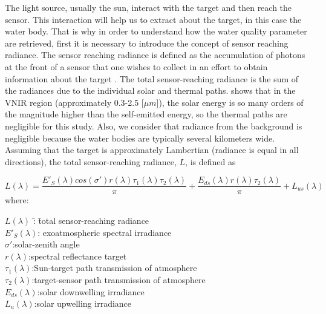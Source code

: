 The light source, usually the sun, interact with the target and then reach the sensor. This interaction will help us to extract about the target, in this case the water body. That is why in order to understand how the water quality parameter are retrieved, first it is necessary to introduce the concept of sensor reaching radiance. The sensor reaching radiance is defined as the accumulation of photons at the front of a sensor that one wishes to collect in an effort to obtain information about the target \cite{GeraceThesis} . The total sensor-reaching radiance is the sum of the radiances due to the individual solar and thermal paths.  \cite{Schott} shows that in the VNIR region (approximately 0.3-2.5 [$\mu m$]), the solar energy is so many orders of the magnitude higher than the self-emitted energy, so the thermal paths are negligible for this study. Also, we consider that radiance from the background is negligible because the water bodies are typically several kilometers wide. Assuming that the target is approximately Lambertian (radiance is equal in all directions), the total sensor-reaching radiance, $L$, is defined as

\begin{equation} \label{eq:gov1}
L(\lambda) = \frac{E'_S(\lambda)cos(\sigma')r(\lambda)\tau_1(\lambda)\tau_2(\lambda)}{\pi} +
                        \frac{E_{ds}(\lambda)r(\lambda)\tau_2(\lambda)}{\pi} + L_{us}(\lambda)
\end{equation} 
where:
\begin{tabbing}
\indent \indent \indent  $L(\lambda)$ \hspace{1mm}\=:  \indent \= total sensor-reaching radiance\\
\indent \indent \indent  $E'_S(\lambda)$\>: \>exoatmospheric spectral irradiance\\
\indent \indent \indent $\sigma'$\>:\>solar-zenith angle\\
\indent \indent \indent $r(\lambda)$\>:\>spectral reflectance target\\
\indent \indent \indent $\tau_1(\lambda)$\>:\>Sun-target path transmission of atmosphere\\
\indent \indent \indent $\tau_2(\lambda)$\>:\>target-sensor path transmission of atmosphere\\
\indent \indent \indent $E_{ds}(\lambda)$\>:\>solar downwelling irradiance\\
\indent \indent \indent $L_{u}(\lambda)$\>:\>solar upwelling irradiance\\
\end{tabbing}

